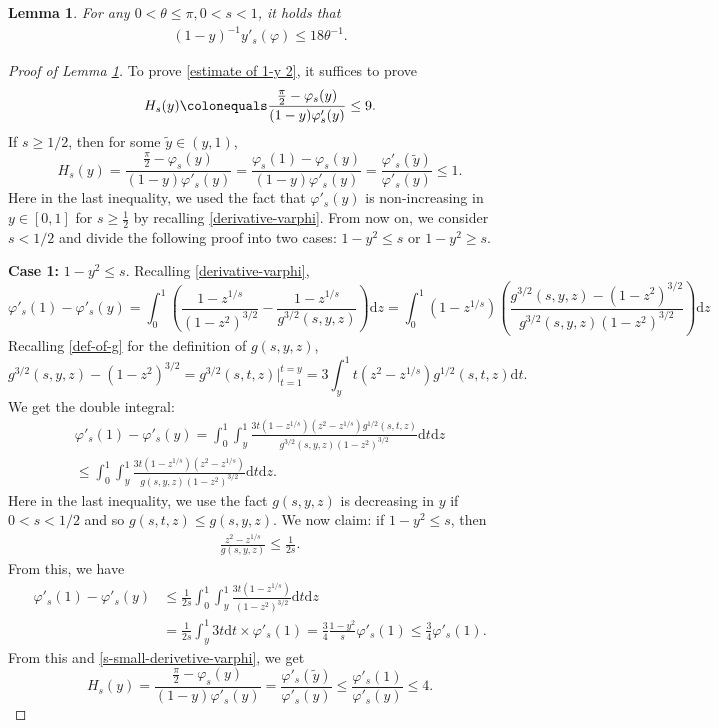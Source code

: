 \documentclass[reqno,10pt]{amsart}
\let\vf=\varphi
\def\th{\theta}
\newcommand{\ben}{\begin{eqnarray}}
\newcommand{\een}{\end{eqnarray}}
\newcommand{\beno}{\begin{eqnarray*}}
\newcommand{\eeno}{\end{eqnarray*}}
\newtheorem{lem}{Lemma}[section]
\theoremstyle{definition}
\numberwithin{equation}{section}
\begin{document}
\begin{lem}\label{key-estimate} For any  $0 < \theta \leq  \pi, 0<s<1$, it holds that
\ben\label{estimate of 1-y 2}
(1-y)^{-1}y'_s(\vf)\le 18 \th^{-1}.
\een
\end{lem}
\begin{proof}[Proof of Lemma \ref{key-estimate}]
	To prove \eqref{estimate of 1-y 2}, it suffices to prove
	\ben \label{def-H-s-y}
	H_s(y) \colonequals \frac{\frac{\pi}{2}-\varphi_s(y)}{(1-y)\vf'_s(y)} \leq 9.
	\een
	If $s \geq 1/2$, then for some $\tilde{y} \in (y,1)$,	$$H_s(y)=\frac{\frac{\pi}{2}-\vf_s(y)}{(1-y)\vf'_s(y)}=\frac{\vf_s(1)-\vf_s(y)}{(1-y)\vf'_s(y)}=\frac{\vf'_s(\tilde{y})}{\vf'_s(y)}\le 1.$$
	Here in the last inequality, we used the fact that  $\vf'_s(y)$ is non-increasing in $y\in[0,1]$ for $s \geq \frac{1}{2}$ by recalling \eqref{derivative-varphi}.
From now on, we consider $s < 1/2$	and divide the following proof into two cases: $1-y^2\le s$ or $1-y^2\ge s$.

	\textbf{Case 1:} $1-y^2\le s$. Recalling \eqref{derivative-varphi},
	$$\vf'_s(1)-\vf'_s(y)=\int_{0}^{1}\left(\frac{1-z^{1/s}}{(1-z^2)^{3/2}}-\frac{1-z^{1/s}}{g^{3/2}(s,y,z)}\right)\mathrm{d}z=\int_{0}^{1}(1-z^{1/s})\left(\frac{g^{3/2}(s,y,z)-(1-z^2)^{3/2}}{g^{3/2}(s,y,z)(1-z^2)^{3/2}}\right)\mathrm{d}z$$
	Recalling \eqref{def-of-g} for the definition of $g(s,y,z)$,
	$$g^{3/2}(s,y,z)-(1-z^2)^{3/2}=g^{3/2}(s,t,z)|_{t=1}^{t=y} =3
	\int_{y}^{1}t(z^2-z^{1/s})g^{1/2}(s,t,z)\mathrm{d}t.$$
	We get the double integral:
	\beno
	\vf'_s(1)-\vf'_s(y)=\int_{0}^{1}\int_{y}^{1}\frac{3t(1-z^{1/s})(z^2-z^{1/s})g^{1/2}(s,t,z)}{g^{3/2}(s,y,z)(1-z^2)^{3/2}}\mathrm{d}t\mathrm{d}z
	\\ \le \int_{0}^{1}\int_{y}^{1} \frac{3t(1-z^{1/s})(z^2-z^{1/s})}{g(s,y,z)(1-z^2)^{3/2}}\mathrm{d}t\mathrm{d}z.
	\eeno
	Here in the last inequality, we use the fact $g(s,y,z)$ is decreasing in $y$ if $0<s<1/2$ and so $g(s,t,z)\le g(s,y,z)$. We now claim: if $1-y^2\le s$, then
	\ben\label{A1.2}
	\frac{z^2-z^{1/s}}{g(s,y,z)}\le \frac{1}{2s}.
	\een
	From this, we have	
	$$
	\begin{aligned}
		\vf'_s(1)-\vf'_s(y) &\le \frac{1}{2s}\int_{0}^{1}\int_{y}^{1}\frac{3t(1-z^{1/s})}{(1-z^2)^{3/2}}\mathrm{d}t\mathrm{d}z\\
		&= \frac{1}{2s}\int_{y}^{1}3t\mathrm{d}t\times \vf'_s(1)=\frac{3}{4}\frac{1-y^2}{s}\vf'_s(1) 
		\le \frac{3}{4}\vf'_s(1).
	\end{aligned}
	$$
	From this and \eqref{s-small-derivetive-varphi}, we get
	$$H_s(y)=\frac{\frac{\pi}{2}-\vf_s(y)}{(1-y)\vf'_s(y)}=\frac{\vf'_s(\tilde{y})}{\vf'_s(y)}\le \frac{\vf'_s(1)}{\vf'_s(y)}\le 4.$$
	

\end{proof}
\end{document}
